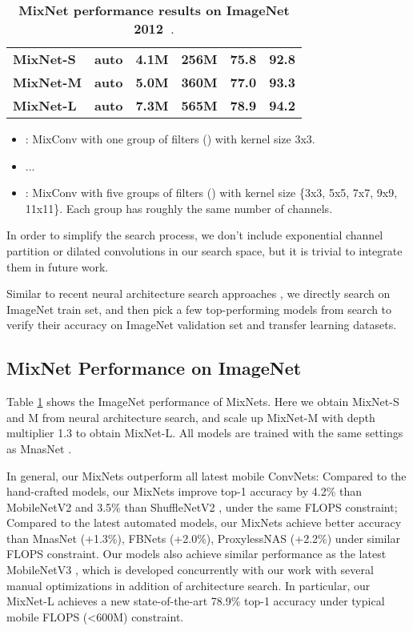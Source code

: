 \documentclass{sty/bmvc2k}
\begin{document}
\begin{table}
{\begin{tabular}{l|c|cc|cc}
        \midrule[0.1em]
        \bf MixNet-S    &  \bf auto    & \bf  4.1M  & \bf 256M & \bf 75.8 & \bf 92.8 \\
		\bf MixNet-M    &  \bf auto    &  \bf 5.0M  & \bf 360M & \bf 77.0 & \bf 93.3  \\  
		\bf MixNet-L    &  \bf auto    &  \bf 7.3M  & \bf 565M & \bf 78.9 & \bf 94.2  \\          \toprule[0.2em]                                                             
        \end{tabular}
    } 
    \vskip 0.05in
    \caption{
        \textbf{MixNet performance results on ImageNet 2012~\cite{imagenet15}}.
    }
    \vskip -0.1in                                           
    \label{tab:imagenet}       
\end{table}      

\begin{itemize}
	\itemsep0em 
	\item {}: MixConv with one group of filters () with kernel size 3x3.
	\item ...
	\item {}: MixConv with five groups of filters () with kernel size \{3x3, 5x5, 7x7, 9x9, 11x11\}. Each group has roughly the same number of channels. 
\end{itemize}

\noindent In order to simplify the search process, we don't include exponential channel partition or dilated convolutions in our search space, but it is trivial to integrate them in future work.


Similar to recent neural architecture search approaches \cite{mnas19,proxyless19,fbnet19}, we directly search on ImageNet train set, and then pick a few top-performing models from search to verify their accuracy on ImageNet validation set and transfer learning datasets.


\subsection{MixNet Performance on ImageNet}


Table \ref{tab:imagenet} shows the ImageNet performance of MixNets. Here we obtain MixNet-S and M from neural architecture search, and scale up MixNet-M with depth multiplier 1.3 to obtain MixNet-L. All models are trained with the same settings as MnasNet \cite{mnas19}.

In general, our MixNets outperform all latest mobile ConvNets: Compared to the hand-crafted models, our MixNets improve top-1 accuracy by 4.2\% than MobileNetV2 \cite{mobilenetv218} and 3.5\% than ShuffleNetV2 \cite{shufflenetv218}, under the same FLOPS constraint;  Compared to the latest automated models, our MixNets  achieve better accuracy than MnasNet (+1.3\%), FBNets (+2.0\%), ProxylessNAS (+2.2\%) under similar FLOPS constraint. Our models also achieve similar performance as the latest MobileNetV3 \cite{mobilenetv319}, which is developed concurrently with our work with several manual optimizations in addition of architecture search. In particular, our MixNet-L achieves a new state-of-the-art 78.9\% top-1 accuracy under typical mobile FLOPS (<600M) constraint.
\end{document}
